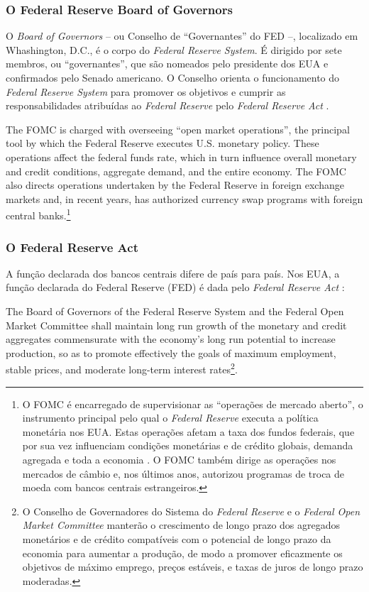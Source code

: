 \documentclass[
	10pt,				%
	openright,			%
	twoside,			%
	a5paper,			%
	english,			%
	french,				%
	spanish,			%
	brazil				%
	]{abntex2}
\renewenvironment{quote}
  {\small\list{}{\rightmargin=0.1cm \leftmargin=4cm}%
   \item\relax}
  {\endlist}
\begin{document}
\subsubsection{O Federal Reserve Board of
Governors}\label{o-federal-reserve-board-of-governors}

O \emph{Board of Governors} -- ou Conselho de ``Governantes'' do FED --,
localizado em Whashington, D.C., é o corpo do \emph{Federal Reserve
System}. É dirigido por sete membros, ou ``governantes'', que são
nomeados pelo presidente dos EUA e confirmados pelo Senado americano. O
Conselho orienta o funcionamento do \emph{Federal Reserve System} para
promover os objetivos e cumprir as responsabilidades atribuídas ao
\emph{Federal Reserve} pelo \emph{Federal Reserve Act} \cite{fed2}.

\begin{quote}
The FOMC is charged with overseeing ``open market operations'', the
principal tool by which the Federal Reserve executes U.S. monetary
policy. These operations affect the federal funds rate, which in turn
influence overall monetary and credit conditions, aggregate demand, and
the entire economy. The FOMC also directs operations undertaken by the
Federal Reserve in foreign exchange markets and, in recent years, has
authorized currency swap programs with foreign central banks.\footnote{O
  FOMC é encarregado de supervisionar as ``operações de mercado
  aberto'', o instrumento principal pelo qual o \emph{Federal Reserve}
  executa a política monetária nos EUA. Estas operações afetam a taxa
  dos fundos federais, que por sua vez influenciam condições monetárias
  e de crédito globais, demanda agregada e toda a economia . O FOMC
  também dirige as operações nos mercados de câmbio e, nos últimos anos,
  autorizou programas de troca de moeda com bancos centrais
  estrangeiros.}
\end{quote}

\subsubsection{O Federal Reserve Act}\label{o-federal-reserve-act}

A função declarada dos bancos centrais difere de país para país. Nos
EUA, a função declarada do Federal Reserve (FED) é dada pelo
\emph{Federal Reserve Act} \cite[Title~II, Sec.~202]{publaw95-188}:

\begin{quote}
The Board of Governors of the Federal Reserve System and the Federal
Open Market Committee shall maintain long run growth of the monetary and
credit aggregates commensurate with the economy's long run potential to
increase production, so as to promote effectively the goals of maximum
employment, stable prices, and moderate long-term interest
rates\footnote{O Conselho de Governadores do Sistema do \emph{Federal
  Reserve} e o \emph{Federal Open Market Committee} manterão o
  crescimento de longo prazo dos agregados monetários e de crédito
  compatíveis com o potencial de longo prazo da economia para aumentar a
  produção, de modo a promover eficazmente os objetivos de máximo
  emprego, preços estáveis, e taxas de juros de longo prazo moderadas.}.
\end{quote}
\end{document}
